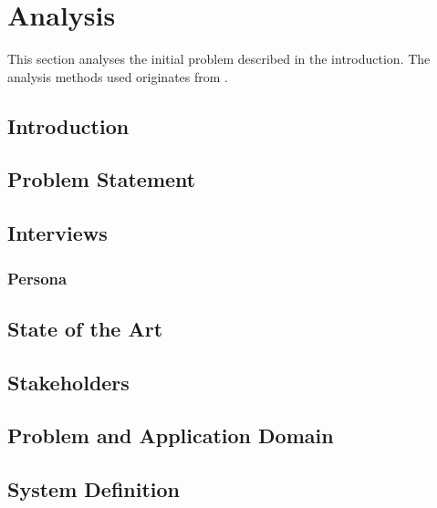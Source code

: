 \chapter{Analysis}

This section analyses the initial problem described in the introduction. The analysis methods used originates from \cite{mathiassen2001objektorienteret}. 

\section{Introduction}


\section{Problem Statement}


\section{Interviews}



\subsection{Persona}


\section{State of the Art}


\section{Stakeholders}


\section{Problem and Application Domain}


\section{System Definition}

